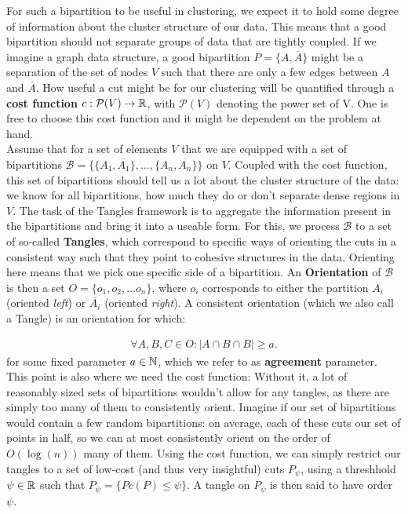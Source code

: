 For such a bipartition to be useful in clustering, we expect it to hold some degree of information about the cluster 
structure of our data. This means that a good bipartition should not separate groups of data that are tightly coupled.
If we imagine a graph data structure, a good bipartition $P = \{A, \overline{A}\}$ might be a separation of the set of nodes $V$ such that there 
are only a few edges between $A$ and $\overline{A}$. How useful a cut might be for our clustering will be quantified through a \textbf{cost function} 
$c: \mathcal{P}(V) \to \mathbb{R}$, with $\mathcal{P}(V)$ denoting the power set of V. One is free to choose this cost function and it might be dependent on the problem at hand. 
\\
Assume that for a set of elements $V$ that we are equipped with a set of bipartitions $\mathcal{B} = \{\{A_1, \overline{A_1}\}, \ldots, \{A_n, \overline{A_n}\} \} $ on $V$.
Coupled with the cost function, this set of bipartitions should tell us a lot about the cluster structure of the data:
we know for all bipartitions, how much they do or don't separate dense regions in $V$. The task of the Tangles framework is to aggregate
the information present in the bipartitions and bring it into a useable form. For this, we process $\mathcal{B}$ to a set of so-called \textbf{Tangles}, which
correspond to specific ways of orienting the cuts in a consistent way such that they point to cohesive structures in the data. 
Orienting here means that we pick one specific side of a bipartition. An \textbf{Orientation} of $\mathcal{B}$ is then a set $O = \{o_1, o_2, \ldots o_n\}$, where $o_i$ 
corresponds to either the partition $A_i$ (oriented \textit{left}) or $\overline{A_i}$ (oriented \textit{right}). A consistent orientation (which we also call a Tangle) is an orientation for which:

\begin{align}
    \forall A,B,C \in O: \left| A \cap B \cap B \right| \ge a
.\end{align}
for some fixed parameter $a \in \mathbb{N}$, which we refer to as \textbf{agreement} parameter. This point is also where we need the cost function: Without it, a lot
of reasonably sized sets of bipartitions wouldn't allow for any tangles, as there are simply too many of them to consistently orient. Imagine if our set of bipartitions would 
contain a few random bipartitions: on average, each of these cuts our set of points in half, so we can at most consistently orient on the order of $O(\log(n))$ many of them.
Using the cost function, we can simply restrict our tangles to a set of low-cost (and thus very insightful) cuts $P_{\psi}$, using a threshhold $\psi \in \mathbb{R}$ such that
$P_{\psi} = \{ P c(P) \le \psi \}$. A tangle on $P_{\psi}$ is then said to have order $\psi$.


